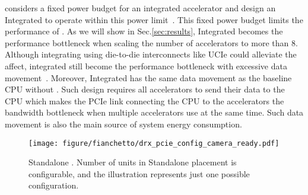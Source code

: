 \dmx considers a fixed power budget 
for an integrated accelerator and design an Integrated \drx to operate within this power limit~\cite{supermicro-sapphire-rapids, ibm-compression-accelerator:isca:2020}.  
%
%
%
This fixed power budget limits the performance of \drx.
%
As we will show in Sec.\ref{sec:results}, Integrated \drx becomes the performance bottleneck when scaling the number of accelerators to more than 8.
%    
Although integrating \drx %
using die-to-die interconnects like UCIe could alleviate the affect, integrated \drx still become the performance bottleneck with excessive data movement~\cite{amd-chiplet:isca:2021, odsa-bow-spec, ucie-spec}.
%
Moreover, Integrated \drx has the same data movement as the baseline CPU without \drx. Such design requires all accelerators to send their data to the CPU which makes the PCIe link connecting the CPU to the accelerators the bandwidth bottleneck when multiple accelerators use \drx at the same time. Such data movement is also the main source of system energy consumption. %

\begin{figure}[ht!]
    \centering
    \texttt{[image: figure/fianchetto/drx\_pcie\_config\_camera\_ready.pdf]}
    \caption{Standalone \drx. Number of \drx units in Standalone placement is configurable, and the illustration represents just one possible configuration.}
    \label{fig:standalone-drx}
\end{figure}

